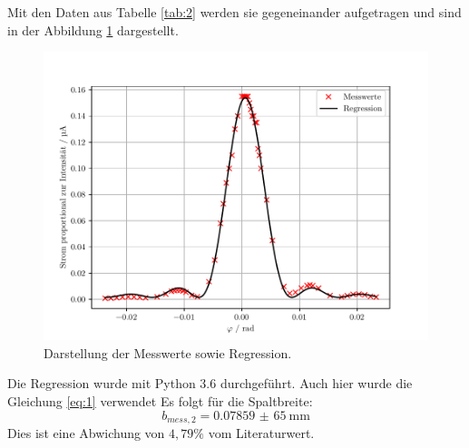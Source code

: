 Mit den Daten aus Tabelle \ref{tab:2} werden sie gegeneinander aufgetragen und sind in der Abbildung
\ref{abb:5} dargestellt.
\begin{figure}[H]
  \centering
  \includegraphics{plot2.pdf}
  \caption{Darstellung der Messwerte sowie Regression.}
  \label{abb:5}
\end{figure}
Die Regression wurde mit Python 3.6 durchgeführt. Auch hier wurde die Gleichung \ref{eq:1} verwendet
Es folgt für die Spaltbreite:
\begin{equation*}
  b_{mess,2} = \SI{0,07859(65)}{\milli\metre}
\end{equation*}
Dies ist eine Abwichung von $4,79\%$ vom Literaturwert.
